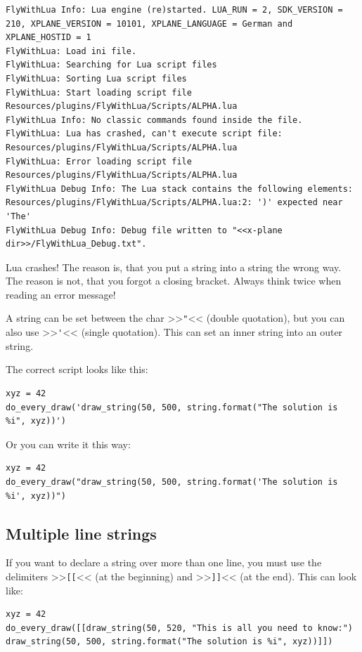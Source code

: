 \documentclass[11pt,parskip=half,a4paper]{scrartcl}
\begin{document}
\begin{lstlisting}[firstnumber=1136]
FlyWithLua Info: Lua engine (re)started. LUA_RUN = 2, SDK_VERSION = 210, XPLANE_VERSION = 10101, XPLANE_LANGUAGE = German and XPLANE_HOSTID = 1
FlyWithLua: Load ini file.
FlyWithLua: Searching for Lua script files
FlyWithLua: Sorting Lua script files
FlyWithLua: Start loading script file Resources/plugins/FlyWithLua/Scripts/ALPHA.lua
FlyWithLua Info: No classic commands found inside the file.
FlyWithLua: Lua has crashed, can't execute script file: Resources/plugins/FlyWithLua/Scripts/ALPHA.lua
FlyWithLua: Error loading script file Resources/plugins/FlyWithLua/Scripts/ALPHA.lua
FlyWithLua Debug Info: The Lua stack contains the following elements:
Resources/plugins/FlyWithLua/Scripts/ALPHA.lua:2: ')' expected near 'The'
FlyWithLua Debug Info: Debug file written to "<<x-plane dir>>/FlyWithLua_Debug.txt".
\end{lstlisting}

Lua crashes! The reason is, that you put a string into a string the wrong way. The reason is not, that you forgot a closing bracket. Always think twice when reading an error message!

A string can be set between the char >>\verb|"|<< (double quotation), but you can also use >>\verb|'|<< (single quotation). This can set an inner string into an outer string.

The correct script looks like this:

\begin{lstlisting}
xyz = 42
do_every_draw('draw_string(50, 500, string.format("The solution is %i", xyz))')
\end{lstlisting}

Or you can write it this way:

\begin{lstlisting}
xyz = 42
do_every_draw("draw_string(50, 500, string.format('The solution is %i', xyz))")
\end{lstlisting}

\subsection{Multiple line strings}

If you want to declare a string over more than one line, you must use the delimiters >>\verb|[[|<< (at the beginning) and >>\verb|]]|<< (at the end). This can look like:

\begin{lstlisting}
xyz = 42
do_every_draw([[draw_string(50, 520, "This is all you need to know:")
draw_string(50, 500, string.format("The solution is %i", xyz))]])
\end{lstlisting}
\end{document}
